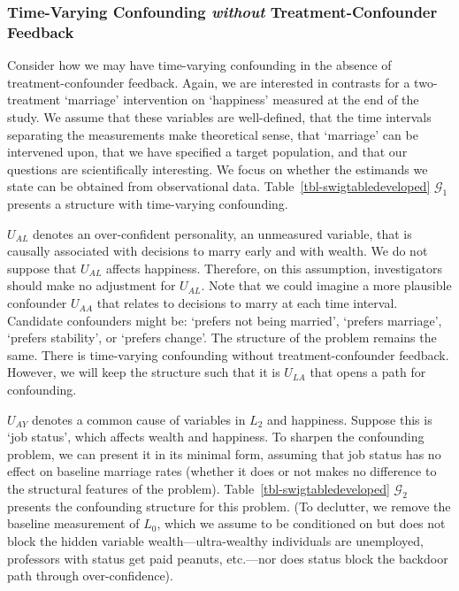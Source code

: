 \documentclass[
  single column]{article}
\begin{document}
\subsubsection{\texorpdfstring{Time-Varying Confounding \emph{without}
Treatment-Confounder
Feedback}{Time-Varying Confounding without Treatment-Confounder Feedback}}\label{time-varying-confounding-without-treatment-confounder-feedback}

Consider how we may have time-varying confounding in the absence of
treatment-confounder feedback. Again, we are interested in contrasts for
a two-treatment `marriage' intervention on `happiness' measured at the
end of the study. We assume that these variables are well-defined, that
the time intervals separating the measurements make theoretical sense,
that `marriage' can be intervened upon, that we have specified a target
population, and that our questions are scientifically interesting. We
focus on whether the estimands we state can be obtained from
observational data. Table~\ref{tbl-swigtabledeveloped} \(\mathcal{G}_1\)
presents a structure with time-varying confounding.

\(U_{AL}\) denotes an over-confident personality, an unmeasured
variable, that is causally associated with decisions to marry early and
with wealth. We do not suppose that \(U_{AL}\) affects happiness.
Therefore, on this assumption, investigators should make no adjustment
for \(U_{AL}\). Note that we could imagine a more plausible confounder
\(U_{AA}\) that relates to decisions to marry at each time interval.
Candidate confounders might be: `prefers not being married', `prefers
marriage', `prefers stability', or `prefers change'. The structure of
the problem remains the same. There is time-varying confounding without
treatment-confounder feedback. However, we will keep the structure such
that it is \(U_{LA}\) that opens a path for confounding.

\(U_{AY}\) denotes a common cause of variables in \(L_2\) and happiness.
Suppose this is `job status', which affects wealth and happiness. To
sharpen the confounding problem, we can present it in its minimal form,
assuming that job status has no effect on baseline marriage rates
(whether it does or not makes no difference to the structural features
of the problem). Table~\ref{tbl-swigtabledeveloped} \(\mathcal{G}_2\)
presents the confounding structure for this problem. (To declutter, we
remove the baseline measurement of \(L_0\), which we assume to be
conditioned on but does not block the hidden variable
wealth---ultra-wealthy individuals are unemployed, professors with
status get paid peanuts, etc.---nor does status block the backdoor path
through over-confidence).
\end{document}
